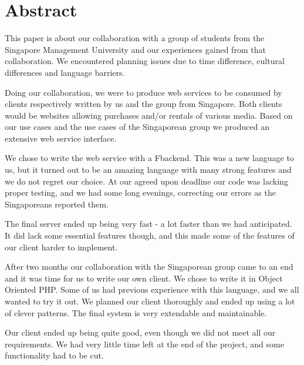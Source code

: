 \section*{Abstract}
This paper is about our collaboration with a group of students from the Singapore Management University and our experiences gained from that collaboration. We encountered planning issues due to time difference, cultural differences and language barriers.

Doing our collaboration, we were to produce web services to be consumed by clients respectively written by us and the group from Singapore. Both clients would be websites allowing purchases and/or rentals of various media.
Based on our use cases and the use cases of the Singaporean group we produced an extensive web service interface.

We chose to write the web service with a F\Sh backend. This was a new language to us, but it turned out to be an amazing language with many strong features and we do not regret our choice.
At our agreed upon deadline our code was lacking proper testing, and we had some long evenings, correcting our errors as the Singaporeans reported them.

The final server ended up being very fast - a lot faster than we had anticipated. It did lack some essential features though, and this made some of the features of our client harder to implement.

After two months our collaboration with the Singaporean group came to an end and it was time for us to write our own client. We chose to write it in Object Oriented PHP. Some of us had previous experience with this language, and we all wanted to try it out. We planned our client thoroughly and ended up using a lot of clever patterns. The final system is very extendable and maintainable.

Our client ended up being quite good, even though we did not meet all our requirements. We had very little time left at the end of the project, and some functionality had to be cut.
\newpage